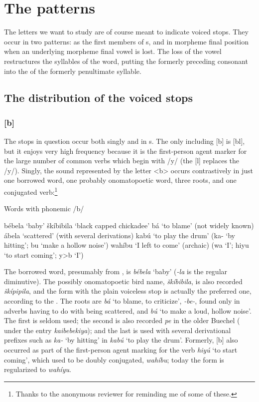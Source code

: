 \documentclass[output=paper]{LSP/langsci}
\begin{document}
\section{The patterns}

The letters we want to study are of course meant to indicate voiced stops. They occur in two patterns: as the first members of s, and in morpheme final position when an underlying morpheme final vowel is lost. The loss of the vowel restructures the syllables of the word, putting the formerly preceding consonant into the  of the formerly penultimate syllable.

\subsection{The distribution of the voiced stops}

\subsubsection{[b]}

The stops in question occur both singly and in s. The only  including [b] is [bl], but it enjoys very high frequency because it is the first-person agent marker for the large number of common verbs which begin with /y/ (the [l] replaces the /y/). Singly, the sound represented by the letter <b> occurs contrastively in just one borrowed word, one probably onomatopoetic word, three roots, and one conjugated verb:\footnote{Thanks to the anonymous reviewer for reminding me of some of these.}

\begin{exe} \label{ex:rood:1}
\ex Words with phonemic /b/
\begin{xlist}
\ex bébela `baby'
\ex \v{s}kíbibila `black capped chickadee'
\ex bá `to blame' (not widely known)
\ex ábela `scattered' (with several derivations)
\ex kabú `to play the drum' (ka- `by hitting'; bu `make a hollow noise')
\ex wahíbu `I left to come' (archaic) (wa `I'; hiyu `to start coming'; y>b `I')
\end{xlist}
\end{exe} 

The borrowed word, presumably from , is \textit{bébela} `baby' (\textit{-la} is the regular  diminutive). The possibly onomatopoetic bird name, \textit{\v{s}kíbibila}, is also recorded \textit{\v{s}kípipila}, and the form with the plain voiceless stop is actually the preferred one, according to the . The roots are \textit{bá} `to blame, to criticize', \textit{-be-}, found only in adverbs having to do with being scattered, and \textit{bú} `to make a loud, hollow noise'. The first is seldom used; the second is also recorded \textit{pe} in the older Buechel  (\citealt[278]{Buechel1970} under the entry \textit{kaibebekiya}); and the last is used with several derivational prefixes such as \textit{ka-} `by hitting' in \textit{kabú} `to play the drum'. Formerly, [b] also occurred as part of the first-person agent marking for the verb \textit{hiyú} `to start coming', which used to be doubly conjugated, \textit{wahíbu}; today the form is regularized to \textit{wahíyu}.
\end{document}
